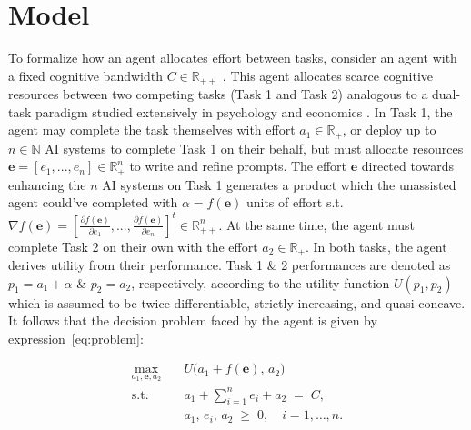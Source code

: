 \section{Model}
\label{sec:Framework}
To formalize how an agent allocates effort between tasks, consider an agent with a fixed cognitive bandwidth $C\in\mathbb{R}_{++}$ \citep{simon1955behavioral,kahneman1973attention,norman1975data,navon1979economy,sims2003implications}. This agent allocates scarce cognitive resources between two competing tasks (Task 1 and Task 2) analogous to a dual-task paradigm studied extensively in psychology \citep{pashler1994dual} and economics \citep{holmstrom1991multitask,buser2012multitasking}. In Task 1, the agent may complete the task themselves with effort $a_1\in\mathbb{R}_+$, or deploy up to $n\in\mathbb{N}$ AI systems to complete Task 1 on their behalf, but must allocate resources $\mathbf{e}=[e_1,...,e_n]\in\mathbb{R}^n_{+}$ to write and refine prompts. The effort $\mathbf{e}$ directed towards enhancing the $n$ AI systems on Task 1 generates a product which the unassisted agent could've completed with $\alpha=f(\mathbf{e})$ units of effort s.t. $\nabla f(\mathbf{e})=[\frac{\partial f(\mathbf{e})}{\partial e_1},...,\frac{\partial f(\mathbf{e})}{\partial e_n}]^t\in\mathbb{R}^n_{++}$. At the same time, the agent must complete Task 2 on their own with the effort $a_2\in\mathbb{R}_{+}$. In both tasks, the agent derives utility from their performance. Task 1 \& 2 performances are denoted as $p_1=a_1+\alpha$ \& $p_2=a_2$, respectively, according to the utility function $U(p_1,p_2)$ \citep{drichoutis2020economic} which is assumed to be twice differentiable, strictly increasing, and quasi-concave. It follows that the decision problem faced by the agent is given by expression~\ref{eq:problem}:

\begin{equation}\label{eq:problem}
\begin{aligned}
\max_{a_1,\mathbf{e},a_2}\quad
& U\bigl(a_1 + f(\mathbf{e}),\, a_2\bigr)\\[6pt]
\text{s.t.}\quad
& a_1 + \sum_{i=1}^{n} e_i + a_2 \;=\; C,\\
& a_1,\,e_i,\,a_2 \;\ge\; 0,\quad i = 1,\dots,n.
\end{aligned}
\end{equation}

